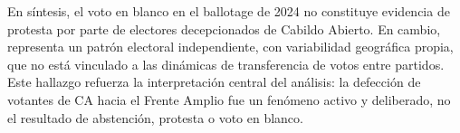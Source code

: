En síntesis, el voto en blanco en el ballotage de 2024 no constituye evidencia de protesta por parte de electores decepcionados de Cabildo Abierto. En cambio, representa un patrón electoral independiente, con variabilidad geográfica propia, que no está vinculado a las dinámicas de transferencia de votos entre partidos. Este hallazgo refuerza la interpretación central del análisis: la defección de votantes de CA hacia el Frente Amplio fue un fenómeno activo y deliberado, no el resultado de abstención, protesta o voto en blanco.
